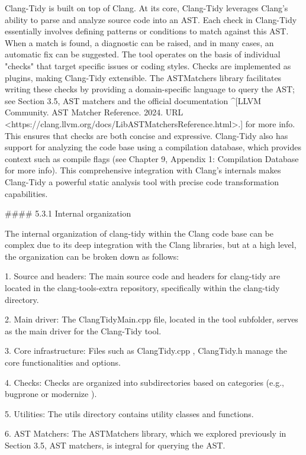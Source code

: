 

\begin{markdown}

Clang-Tidy is built on top of Clang. At its core, Clang-Tidy leverages Clang's ability to parse and analyze source code into an AST. Each check in Clang-Tidy essentially involves defining patterns or conditions to match against this AST. When a match is found, a diagnostic can be raised, and in many cases, an automatic fix can be suggested. The tool operates on the basis of individual "checks" that target specific issues or coding styles. Checks are implemented as plugins, making Clang-Tidy extensible. The ASTMatchers library facilitates writing these checks by providing a domain-specific language to query the AST; see Section 3.5, AST matchers and the official documentation ^[LLVM Community. AST Matcher Reference. 2024. URL <https://clang.llvm.org/docs/LibASTMatchersReference.html>.] for more info. This ensures that checks are both concise and expressive. Clang-Tidy also has support for analyzing the code base using a compilation database, which provides context such as compile flags (see Chapter 9, Appendix 1: Compilation Database for more info). This comprehensive integration with Clang's internals makes Clang-Tidy a powerful static analysis tool with precise code transformation capabilities.

#### 5.3.1 Internal organization

The internal organization of clang-tidy within the Clang code base can be complex due to its deep integration with the Clang libraries, but at a high level, the organization can be broken down as follows:

1. Source and headers: The main source code and headers for clang-tidy are located in the clang-tools-extra repository, specifically within the clang-tidy directory.

2. Main driver: The ClangTidyMain.cpp file, located in the tool subfolder, serves as the main driver for the Clang-Tidy tool.

3. Core infrastructure: Files such as ClangTidy.cpp , ClangTidy.h manage the core functionalities and options.

4. Checks: Checks are organized into subdirectories based on categories (e.g., bugprone or modernize ).

5. Utilities: The utils directory contains utility classes and functions.

6. AST Matchers: The ASTMatchers library, which we explored previously in Section 3.5, AST matchers, is integral for querying the AST.


\end{markdown}
